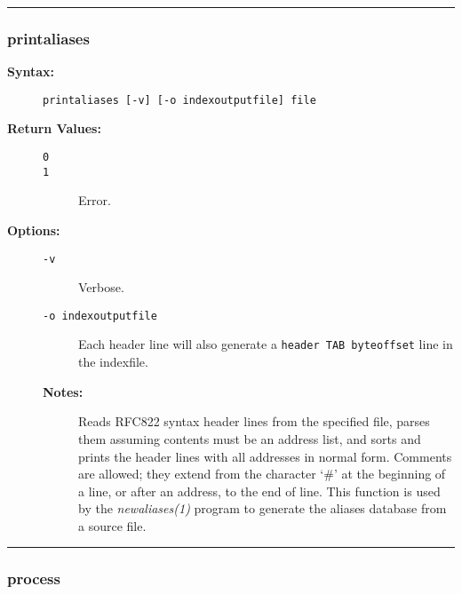 \hrule
\subsubsection{printaliases}

\begin{description}
\item[{\bf Syntax:}] \mbox{}

{\tt printaliases [-v] [-o indexoutputfile] file}

\item[{\bf Return Values:}] \mbox{}

\begin{description}
\item[{\tt 0}] \mbox{}



\item[{\tt 1}] \mbox{}

Error.

\end{description}


\item[{\bf Options:}] \mbox{}

\begin{description}
\item[{\tt -v}] \mbox{}

Verbose.

\item[{\tt -o indexoutputfile}] \mbox{}

Each header line will also generate 
a {\tt header TAB byteoffset} line in the indexfile.

\item[{\bf Notes:}] \mbox{}

Reads RFC822 syntax header lines from the specified
file, parses them assuming contents must be an address list, and sorts 
and prints the header lines with all addresses in normal form. Comments 
are allowed; they extend from the character `\#' at the beginning of 
a line, or after an address, to the end of line. This function is used 
by the {\em newaliases(1)} program to generate the aliases database 
from a source file.

\end{description}


\end{description}


\hrule
\subsubsection{process}

